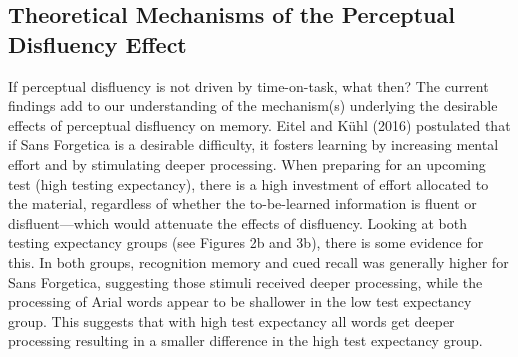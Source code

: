 \documentclass[
  english,
  jou]{apa7}
\begin{document}
\hypertarget{theoretical-mechanisms-of-the-perceptual-disfluency-effect}{%
\subsection{Theoretical Mechanisms of the Perceptual Disfluency Effect}\label{theoretical-mechanisms-of-the-perceptual-disfluency-effect}}

If perceptual disfluency is not driven by time-on-task, what then? The current findings add to our understanding of the mechanism(s) underlying the desirable effects of perceptual disfluency on memory. Eitel and Kühl (2016) postulated that if Sans Forgetica is a desirable difficulty, it fosters learning by increasing mental effort and by stimulating deeper processing. When preparing for an upcoming test (high testing expectancy), there is a high investment of effort allocated to the material, regardless of whether the to-be-learned information is fluent or disfluent---which would attenuate the effects of disfluency. Looking at both testing expectancy groups (see Figures 2b and 3b), there is some evidence for this. In both groups, recognition memory and cued recall was generally higher for Sans Forgetica, suggesting those stimuli received deeper processing, while the processing of Arial words appear to be shallower in the low test expectancy group. This suggests that with high test expectancy all words get deeper processing resulting in a smaller difference in the high test expectancy group.
\end{document}
